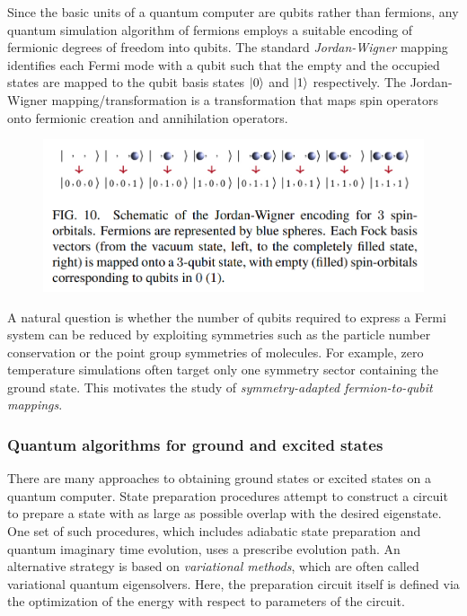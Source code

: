 \documentclass{book}
\theoremstyle{definition}
\begin{document}
\begin{enumerate}
	Since the basic units of a quantum computer are qubits rather than fermions, any quantum simulation algorithm of fermions employs a suitable encoding of fermionic degrees of freedom into qubits. The standard \textit{Jordan-Wigner} mapping identifies each Fermi mode with a qubit such that the empty and the occupied states are mapped to the qubit basis states $\ket{0}$ and $\ket{1}$ respectively. The Jordan-Wigner mapping/transformation is a transformation that maps spin operators onto fermionic creation and annihilation operators. 
	\begin{figure}[!htb]
		\centering
		\includegraphics[scale=0.3]{jw}
	\end{figure}
	A natural question is whether the number of qubits required to express a Fermi system can be reduced by exploiting symmetries such as the particle number conservation or
	the point group symmetries of molecules. For example, zero
	temperature simulations often target only one symmetry sector containing the ground state. This motivates the study
	of \textit{symmetry-adapted fermion-to-qubit mappings}.
\end{enumerate} 



\subsubsection{Quantum algorithms for ground and excited states}

There are many approaches to obtaining ground states or
excited states on a quantum computer. State preparation
procedures attempt to construct a circuit to prepare a state
with as large as possible overlap with the desired eigenstate. One set of such procedures, which includes adiabatic state preparation and quantum imaginary time evolution, uses a prescribe evolution path. An alternative strategy is based on \textit{variational methods}, which are often called variational quantum eigensolvers. Here, the preparation circuit itself is defined via the optimization of the energy with respect to parameters of the circuit. \\
\end{document}
